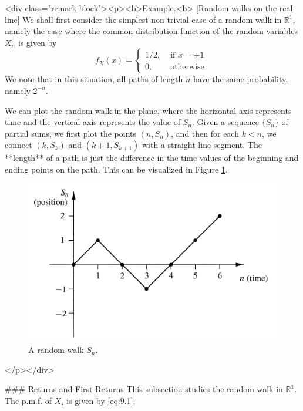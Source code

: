 <div class="remark-block"><p><b>Example.<b> [Random walks on the real line]
We shall first consider the simplest non-trivial case of a random walk in $\mathbb{R}^1$, namely the case where the common distribution function of the random variables $X_n$ is given by
$$$$$$$$\begin{equation}
    \label{eq:9.1}
    \tag{9-1}
    f_{X}(x)=\left\{\begin{array}{ll}{1 / 2,} & {\text { if } x=\pm 1} \\ {0,} & {\text { otherwise }}\end{array}\right.
\end{equation}$$$$$$$$
We note that in this situation, all paths of length $n$ have the same probability, namely $2^{-n}$.

We can plot the random walk in the plane, where the horizontal axis represents time and the vertical axis represents the value of $S_n$. Given a sequence $\{S_n\}$ of partial sums, we first plot the points $(n, S_n)$, and then for each $k < n$, we connect $(k, S_k)$ and $(k + 1, S_{k+1})$ with a straight line segment. The **length** of a path is just the difference in the time values of the beginning and ending points on the path. This can be visualized in Figure \ref{fig:9.1}.

\begin{figure}[!htb]
    \centering
    \includegraphics[scale=0.3]{plots/random_walk.png}
    \caption{A random walk $S_n$.}
    \label{fig:9.1}
\end{figure}
</p></div>



### Returns and First Returns
This subsection studies the random walk in $\mathbb{R}^1$. The p.m.f. of $X_i$ is given by \eqref{eq:9.1}.

